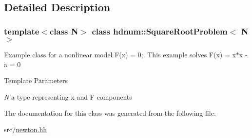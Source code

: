 \subsection{Detailed Description}
\subsubsection*{template$<$class N$>$ class hdnum::SquareRootProblem$<$ N $>$}

Example class for a nonlinear model F(x) = 0;. This example solves F(x) = x$\ast$x -\/ a = 0


\begin{DoxyTemplParams}{Template Parameters}
\item[{\em N}]a type representing x and F components \end{DoxyTemplParams}


The documentation for this class was generated from the following file:\begin{DoxyCompactItemize}
\item 
src/\hyperlink{newton_8hh}{newton.hh}\end{DoxyCompactItemize}
